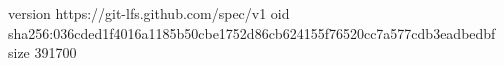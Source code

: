 version https://git-lfs.github.com/spec/v1
oid sha256:036cded1f4016a1185b50cbe1752d86cb624155f76520cc7a577cdb3eadbedbf
size 391700
